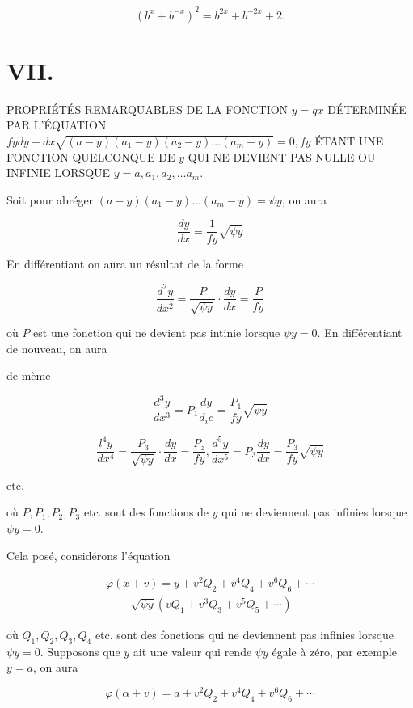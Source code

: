 \documentclass{article}
\begin{document}
\[
\left(b^{x}+b^{-x}\right)^{2}=b^{2 x}+b^{-2 x}+2 .
\]

\section*{VII.}

PROPRIÉTÉS REMARQUABLES DE LA FONCTION \(y=q x\) DÉTERMINÉE PAR L'ÉQUATION \(f y d y-d x \sqrt{(a-y)\left(a_{1}-y\right)\left(a_{2}-y\right) \ldots\left(a_{m}-y\right)}=0, f y\) ÉTANT UNE FONCTION QUELCONQUE DE \(y\) QUI NE DEVIENT PAS NULLE OU INFINIE LORSQUE \(y=a, a_{1}, a_{2}, \ldots a_{m}\).

Soit pour abréger \((a-y)\left(a_{1}-y\right) \ldots\left(a_{m}-y\right)=\psi y\), on aura

\[
\frac{d y}{d x}=\frac{1}{f y} \sqrt{\psi y}
\]

En différentiant on aura un résultat de la forme

\[
\frac{d^{2} y}{d x^{\overline{2}}}=\frac{P}{\sqrt{\psi y}} \cdot \frac{d y}{d x}=\frac{P}{f y}
\]

où \(P\) est une fonction qui ne devient pas intinie lorsque \(\psi y=0\). En différentiant de nouveau, on aura

de mème

\[
\frac{d^{3} y}{d x^{3}}=P_{1} \frac{d y}{d_{i} c}=\frac{P_{1}}{f y} \sqrt{\psi y}
\]

\[
\frac{l^{4} y}{d x^{4}}=\frac{P_{3}}{\sqrt{\psi y}} \cdot \frac{d y}{d x}=\frac{P_{z}}{f y}, \frac{d^{5} y}{d x^{5}}=P_{3} \frac{d y}{d x}=\frac{P_{3}}{f y} \sqrt{\psi y}
\]

etc.

où \(P, P_{1}, P_{2}, P_{3}\) etc. sont des fonctions de \(y\) qui ne deviennent pas infinies lorsque \(\psi y=0\).

Cela posé, considérons l'équation

\[
\begin{gathered}
\varphi(x+v)=y+v^{2} Q_{2}+v^{4} Q_{4}+v^{6} Q_{6}+\cdots \\
\quad+\sqrt{\psi y}\left(v Q_{1}+v^{3} Q_{3}+v^{5} Q_{5}+\cdots\right)
\end{gathered}
\]

où \(Q_{1}, Q_{2}, Q_{3}, Q_{4}\) etc. sont des fonctions qui ne deviennent pas infinies lorsque \(\psi y=0\). Supposons que \(y\) ait une valeur qui rende \(\psi y\) égale à zéro, par exemple \(y=a\), on aura

\[
\varphi(\alpha+v)=a+v^{2} Q_{2}+v^{4} Q_{4}+v^{6} Q_{6}+\cdots
\]
\end{document}
